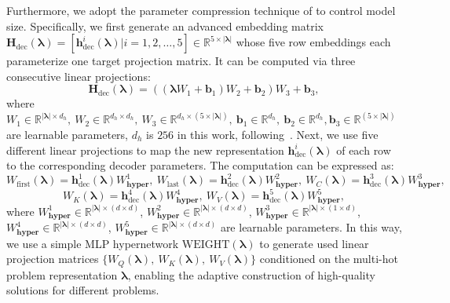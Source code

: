 \documentclass{article}
\theoremstyle{plain}
\theoremstyle{definition}
\theoremstyle{remark}
\begin{document}
Furthermore, we adopt the parameter compression technique of \citet{ha2016hypernetworks} to control model size. Specifically, we first generate an advanced embedding matrix $\bm{H}_{\text{dec}}(\bm{\lambda})=[\bm{h}_{\text{dec}}^i(\bm{\lambda})| i=1,2,\ldots,5] \in \mathbb{R}^{5 \times |\bm{\lambda}|}$ whose five row embeddings each parameterize one target projection matrix. It can be computed via three consecutive linear projections:
\begin{equation}
    \bm{H}_{\text{dec}}(\bm{\lambda}) =   ((\bm{\lambda} W_1+\mathbf{b}_{1})W_2 +\mathbf{b}_{2})W_3 +\mathbf{b}_3,
    \label{eq:hyper_embeddings}
\end{equation}
where $W_1 \in \mathbb{R}^{|\bm{\lambda}|\times d_h},\  W_2 \in \mathbb{R}^{d_h\times d_h},\  W_3 \in \mathbb{R}^{d_h\times (5 \times |\bm{\lambda}|)},\  \mathbf{b}_1\in \mathbb{R}^{d_h},\  \mathbf{b}_2\in \mathbb{R}^{d_h}, \mathbf{b}_3\in \mathbb{R}^{(5 \times |\bm{\lambda}|)}$ are learnable parameters, $d_h$ is $256$ in this work, following~\citet{lin2022pareto}. Next, we use five different linear projections to map the new representation $\bm{h}_{\text{dec}}^i(\bm{\lambda})$ of each row to the corresponding decoder parameters. The computation can be expressed as:
\begin{equation}
    W_{\text{first}}(\bm{\lambda}) = \bm{h}_{\text{dec}}^1(\bm{\lambda})W^{1}_{\textbf{hyper}}, \ W_{\text{last}}(\bm{\lambda}) = \bm{h}_{\text{dec}}^2(\bm{\lambda})W^{2}_{\textbf{hyper}},\ 
    W_{C}(\bm{\lambda}) = \bm{h}_{\text{dec}}^3(\bm{\lambda})W^{3}_{\textbf{hyper}},
\end{equation}
\begin{equation}
    W_{K}(\bm{\lambda}) = \bm{h}_{\text{dec}}^4(\bm{\lambda})W^{4}_{\textbf{hyper}}, \ W_{V}(\bm{\lambda}) = \bm{h}_{\text{dec}}^5(\bm{\lambda})W^{5}_{\textbf{hyper}},
\end{equation}
where $W^{1}_{\textbf{hyper}}\in \mathbb{R}^{|\bm{\lambda}|\times (d\times d)}$, $W^{2}_{\textbf{hyper}}\in \mathbb{R}^{|\bm{\lambda}|\times (d\times d)}$, $W^{3}_{\textbf{hyper}}\in \mathbb{R}^{|\bm{\lambda}|\times (1\times d)}$, $W^{4}_{\textbf{hyper}}\in \mathbb{R}^{|\bm{\lambda}|\times (d\times d)}$, $W^{5}_{\textbf{hyper}}\in \mathbb{R}^{|\bm{\lambda}|\times (d\times d)}$ are learnable parameters. In this way, we use a simple MLP hypernetwork $\mathrm{WEIGHT}(\bm{\lambda})$ to generate used linear projection matrices $\{W_{Q}(\bm{\lambda}),\ W_{K}(\bm{\lambda}),\ W_{V}(\bm{\lambda})\}$ conditioned on the multi-hot problem representation $\bm{\lambda}$, enabling the adaptive construction of high-quality solutions for different problems.
\end{document}
